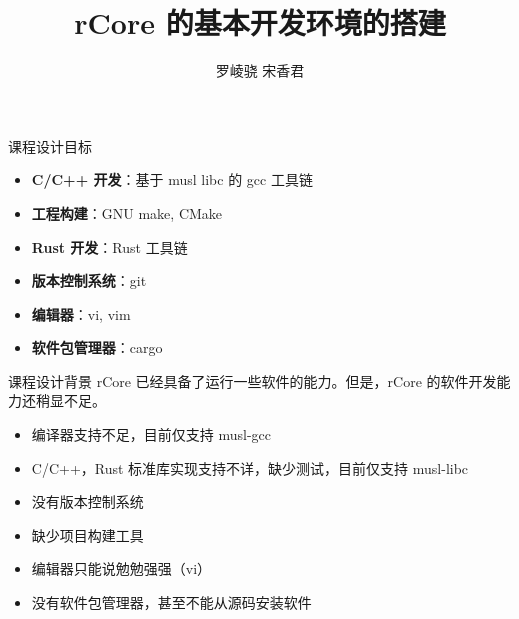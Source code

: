 \documentclass{beamer}
\title{rCore 的基本开发环境的搭建}
\author{罗崚骁 \quad 宋香君}
\begin{document}
\begin{frame}
    \titlepage
\end{frame}

\begin{frame}{课程设计目标}
    \begin{itemize}
        \setlength{\itemsep}{10pt}
        \item \textbf{C/C++ 开发}：基于 musl libc 的 gcc 工具链
        \item \textbf{工程构建}：GNU make, CMake
        \item \textbf{Rust 开发}：Rust 工具链
        \item \textbf{版本控制系统}：git
        \item \textbf{编辑器}：vi, vim
        \item \textbf{软件包管理器}：cargo
    \end{itemize}

\end{frame}

\begin{frame}{课程设计背景}
    rCore 已经具备了运行一些软件的能力。但是，rCore 的软件开发能力还稍显不足。

    \begin{itemize}
        \setlength{\itemsep}{10pt}
        \item 编译器支持不足，目前仅支持 musl-gcc
        \item C/C++，Rust 标准库实现支持不详，缺少测试，目前仅支持 musl-libc
        \item 没有版本控制系统
        \item 缺少项目构建工具
        \item 编辑器只能说勉勉强强（vi）
        \item 没有软件包管理器，甚至不能从源码安装软件
    \end{itemize}
\end{frame}
\end{document}
